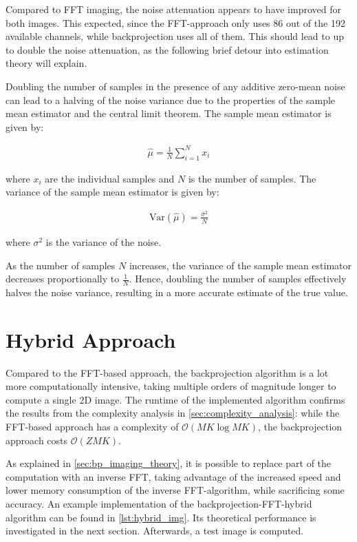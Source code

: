 Compared to FFT imaging, the noise attenuation appears to have improved for both images.
This expected, since the FFT-approach only uses 86 out of the 192 available channels,
while backprojection uses all of them.
This should lead to up to double the noise attenuation,
as the following brief detour into estimation theory will explain.

Doubling the number of samples in the presence of any additive zero-mean noise
can lead to a halving of the noise variance due to the properties of the sample mean estimator
and the central limit theorem.
The sample mean estimator is given by:

\begin{align}
    \hat{\mu} = \frac{1}{N} \sum_{i=1}^{N} x_i
\end{align}

where $ x_i $ are the individual samples and $ N $ is the number of samples.
The variance of the sample mean estimator is given by:

\begin{align}
    \text{Var}(\hat{\mu}) = \frac{\sigma^2}{N}
\end{align}

where $ \sigma^2 $ is the variance of the noise.

As the number of samples $N$ increases,
the variance of the sample mean estimator decreases proportionally to $\frac{1}{N}$.
Hence, doubling the number of samples effectively halves the noise variance,
resulting in a more accurate estimate of the true value.

\newpage
\section{Hybrid Approach}
\label{sec:hybrid_imaging}
Compared to the FFT-based approach, the backprojection algorithm is a lot more computationally intensive,
taking multiple orders of magnitude longer to compute a single 2D image.
The runtime of the implemented algorithm confirms the results from the complexity analysis in \cref{sec:complexity_analysis}:
while the FFT-based approach has a complexity of $\mathcal O(MK\log MK)$, the backprojection approach costs $\mathcal O(ZMK)$.

As explained in \cref{sec:bp_imaging_theory},
it is possible to replace part of the computation with an inverse FFT,
taking advantage of the increased speed and lower memory consumption of the inverse FFT-algorithm,
while sacrificing some accuracy.
An example implementation of the backprojection-FFT-hybrid algorithm can be found in \ref{lst:hybrid_img}.
Its theoretical performance is investigated in the next section. Afterwards, a test image is computed.

